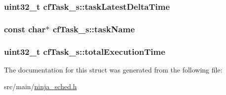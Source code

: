 \hypertarget{structcfTask__s_a1646d4713287068c9c3dc139fa49c23f}{
\subsubsection[{task\+Latest\+Delta\+Time}]{\setlength{\rightskip}{0pt plus 5cm}uint32\+\_\+t cf\+Task\+\_\+s\+::task\+Latest\+Delta\+Time}}\label{structcfTask__s_a1646d4713287068c9c3dc139fa49c23f}
\hypertarget{structcfTask__s_ab9c9ba27f9fb1b72c98e44f995fb2e12}{
\subsubsection[{task\+Name}]{\setlength{\rightskip}{0pt plus 5cm}const char$\ast$ cf\+Task\+\_\+s\+::task\+Name}}\label{structcfTask__s_ab9c9ba27f9fb1b72c98e44f995fb2e12}
\hypertarget{structcfTask__s_ab55f1d125ac2fd676608f6c4733eebe9}{
\subsubsection[{total\+Execution\+Time}]{\setlength{\rightskip}{0pt plus 5cm}uint32\+\_\+t cf\+Task\+\_\+s\+::total\+Execution\+Time}}\label{structcfTask__s_ab55f1d125ac2fd676608f6c4733eebe9}


The documentation for this struct was generated from the following file\+:\begin{DoxyCompactItemize}
\item 
src/main/\hyperlink{ninja__sched_8h}{ninja\+\_\+sched.\+h}\end{DoxyCompactItemize}
